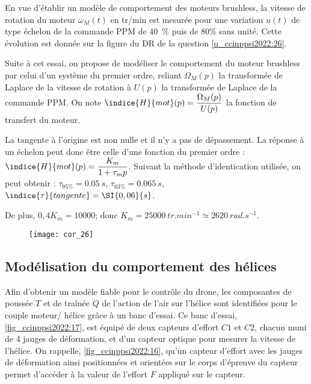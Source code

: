 En vue d’établir un modèle de comportement des moteurs brushless, la vitesse de rotation du
moteur $\omega_M(t)$ en \si{tr/min} est mesurée pour une variation $u(t)$ de type échelon de la commande
PPM de \SI{40}{\%} puis de 80\% sans unité. Cette évolution est donnée sur la figure du DR de la
question \ref{q_ccinppsi2022:26}.

Suite à cet essai, on propose de modéliser le comportement du moteur brushless par celui
d’un système du premier ordre, reliant $\Omega_M(p)$ la transformée de Laplace de la vitesse de rotation à
$U(p)$ la transformée de Laplace de la commande PPM. On note $\indice{H}{mot}(p) = \dfrac{\Omega_M(p)}{
U(p)}$ la fonction de transfert du moteur.

\ifprof
\begin{corrige}

La tangente à l’origine est non nulle et il n'y a pas de dépassement. La réponse à un échelon peut donc être celle d’une fonction du premier ordre :
$\indice{H}{mot}(p)=\dfrac{K_m}{1+\tau_m p}$. Suivant la méthode d'identication utilisée, on peut obtenir : 
$\tau_{95\%}=\SI{0,05}{s}$, 
$\tau_{63\%}=\SI{0,065}{s}$,
$\indice{\tau}{tangente}  =\SI{0,06}{s}$.

De plus, $0,4 K_m=10000$; donc $K_m=\SI{25000}{tr.min^{-1}} \simeq \SI{2620}{rad.s^{-1}}$.
\begin{figure}[H]
\centering
\texttt{[image: cor\_26]}
\end{figure}

\end{corrige}
\else
\fi

\subsection{Modélisation du comportement des hélices}
Afin d’obtenir un modèle fiable pour le contrôle du drone, les composantes de poussée
$T$ et de traînée $Q$ de l’action de l’air sur l’hélice sont identifiées pour le couple moteur/
hélice grâce à un banc d’essai. Ce banc d’essai, \autoref{fig_ccinppsi2022:17}, est équipé de deux capteurs
d’effort $C1$ et $C2$, chacun muni de 4 jauges de déformation, et d’un capteur optique pour
mesurer la vitesse de l’hélice. On rappelle, \autoref{fig_ccinppsi2022:16}, qu’un capteur d’effort avec les jauges
de déformation ainsi positionnées et orientées sur le corps d’épreuve du capteur permet
d’accéder à la valeur de l’effort $F$ appliqué sur le capteur.


